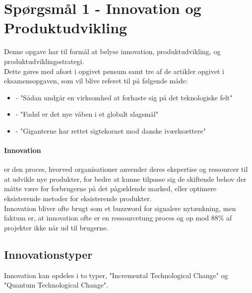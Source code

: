 \section{Spørgsmål 1 - Innovation og Produktudvikling}
Denne opgave har til formål at belyse innovation, produktudvikling, og produktudviklingsstrategi.\\
Dette gøres med afsæt i opgivet pensum samt tre af de artikler opgivet i eksamensopgaven, som vil blive
referet til på følgende måde:\vspace{0.25cm}
\begin{itemize}
    \item \cite[a.1]{eksamensopgave} - "Sådan undgår en virksomhed at forhaste sig på det teknologiske felt"
    \item \cite[a.2]{eksamensopgave} - "Fadøl er det nye våben i et globalt slagsmål"
    \item \cite[a.3]{eksamensopgave} - "Giganterne har rettet sigtekornet mod danske iværksættere"
\end{itemize}
\paragraph{Innovation} er den proces, hvorved organisationer anvender deres ekspertise og
ressourcer til at udvikle nye produkter, for bedre at kunne tilpasse sig de skiftende
behov der måtte være for forbrugerne på det pågældende marked, eller optimere eksisterende metoder for eksisterende produkter.\\
Innovation bliver ofte brugt som et buzzword for signalere nytænkning, men faktum er, at innovation ofte er en ressourcetung proces og op mod 88\% af projekter ikke når ud til brugerne\cite[s. 388]{jones:2013}.
\subsection{Innovationstyper}
Innovation kan opdeles i to typer, "Incremental Technological Change" og "Quantum Technological Change".
